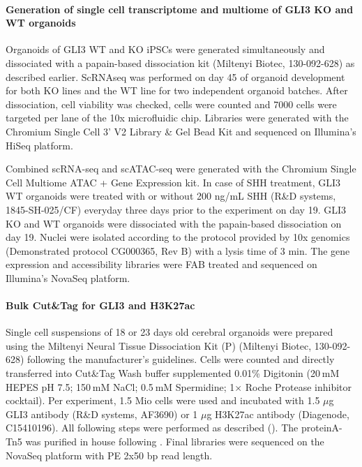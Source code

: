 \paragraph{Generation of single cell transcriptome and multiome of GLI3 KO and WT organoids}
Organoids of GLI3 WT and KO iPSCs were generated simultaneously and dissociated with a papain-based dissociation kit (Miltenyi Biotec, 130-092-628) as described earlier. ScRNAseq was performed on day 45 of organoid development for both KO lines and the WT line for two independent organoid batches. After dissociation, cell viability was checked, cells were counted and 7000 cells were targeted per lane of the 10x microfluidic chip. Libraries were generated with the Chromium Single Cell 3’ V2 Library \& Gel Bead Kit and sequenced on Illumina’s HiSeq platform.

Combined scRNA-seq and scATAC-seq were generated with the Chromium Single Cell Multiome ATAC + Gene Expression kit. In case of SHH treatment, GLI3 WT organoids were treated with or without 200 ng/mL SHH (R\&D systems, 1845-SH-025/CF) everyday three days prior to the experiment on day 19. GLI3 KO and WT organoids were dissociated with the papain-based dissociation on day 19. Nuclei were isolated according to the protocol provided by 10x genomics (Demonstrated protocol CG000365, Rev B) with a lysis time of 3 min. The gene expression and accessibility libraries were FAB treated and sequenced on Illumina’s NovaSeq platform.
 
\paragraph{Bulk Cut\&Tag for GLI3 and H3K27ac}
Single cell suspensions of 18 or 23 days old cerebral organoids were prepared using the Miltenyi Neural Tissue Dissociation Kit (P) (Miltenyi Biotec, 130-092-628) following the manufacturer’s guidelines. Cells were counted and directly transferred into Cut\&Tag Wash buffer supplemented 0.01\% Digitonin (20 mM HEPES pH 7.5; 150 mM NaCl; 0.5 mM Spermidine; 1× Roche Protease inhibitor cocktail). Per experiment, 1.5 Mio cells were used and incubated with 1.5 $\mu$g GLI3 antibody (R\&D systems, AF3690) or 1 $\mu$g H3K27ac antibody (Diagenode, C15410196). All following steps were performed as described (\cite{kaya-okur_cuttag_2019}). The proteinA-Tn5 was purified in house following \cite{kaya-okur_cuttag_2019}. Final libraries were sequenced on the NovaSeq platform with PE 2x50 bp read length.
 

